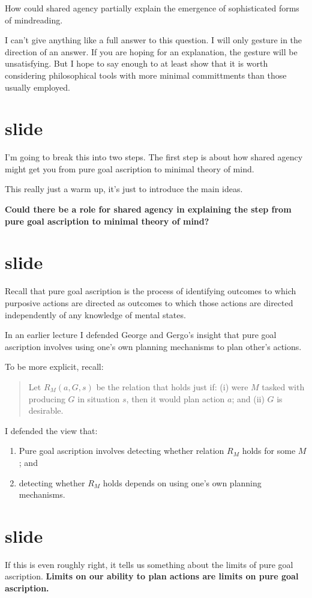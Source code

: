 \documentclass[12pt,\papersize]{extarticle}
\begin{document}
How could shared agency partially explain the emergence of sophisticated forms of mindreading.

I can't give anything like a full answer to this question.
I will only gesture in the direction of an answer.
If you are hoping for an explanation, the gesture will be unsatisfying.
But I hope to say enough to at least show that it is worth considering  philosophical tools with more minimal committments
 than those usually employed.


\section{slide}
I'm going to break this into two steps.
The first step is about how shared agency might get you from pure goal ascription to minimal theory of mind.

This really just a warm up, it's just to introduce the main ideas.

\textbf{Could there be a role for shared agency in explaining the step from pure goal ascription to minimal theory of mind?}


\section{slide}
Recall that pure goal ascription is the process of identifying outcomes to which purposive actions are directed as outcomes to which those actions are directed independently of any knowledge of mental states.

In an earlier lecture I defended George and Gergo's insight that pure goal ascription involves using one's own planning mechanisms to plan other's actions.

To be more explicit, 
recall:
\begin{quote}
Let $R{_M}(a,G,s)$ be the relation that holds just if: (i) were $M$  tasked with producing $G$ in situation $s$, then it would plan action $a$; and (ii) $G$ is desirable.
\end{quote}
%
I defended the view that:
\begin{enumerate}
\item Pure goal ascription involves detecting whether relation $R{_M}$ holds for some $M$; and
\item  detecting whether $R{_M}$ holds depends on using one's own planning mechanisms.
\end{enumerate}


\section{slide}
If this is even roughly right,
it tells us something about the limits of pure goal ascription.
\textbf{Limits on our ability to plan actions are limits on pure goal ascription.}
\end{document}
